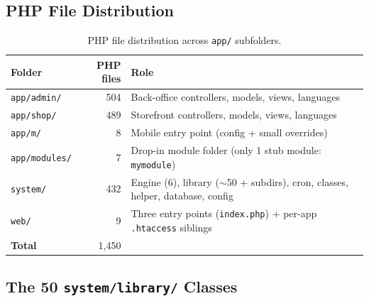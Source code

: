 \documentclass[11pt,a4paper]{article}
\begin{document}
\subsection{PHP File Distribution}

\begin{table}[htbp]
\centering
\caption{PHP file distribution across \texttt{app/} subfolders.}\label{tab:php-distribution}
\small
\begin{tabularx}{\columnwidth}{lrX}
\toprule
\textbf{Folder} & \textbf{PHP files} & \textbf{Role} \\
\midrule
\texttt{app/admin/}    & 504 & Back-office controllers, models, views, languages \\
\texttt{app/shop/}     & 489 & Storefront controllers, models, views, languages \\
\texttt{app/m/}        & 8   & Mobile entry point (config + small overrides) \\
\texttt{app/modules/}  & 7   & Drop-in module folder (only 1 stub module: \texttt{mymodule}) \\
\texttt{system/}       & 432 & Engine (6), library ($\sim$50 + subdirs), cron, classes, helper, database, config \\
\texttt{web/}          & 9   & Three entry points (\texttt{index.php}) + per-app \texttt{.htaccess} siblings \\
\midrule
\textbf{Total}         & 1,450 & \\
\bottomrule
\end{tabularx}
\end{table}

\subsection{The 50 \texttt{system/library/} Classes}
\end{document}
